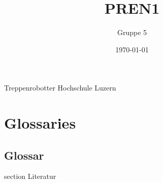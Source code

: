 \documentclass[oneside]{modern}
\title{PREN1}
\author{Gruppe 5}
\date{\today}
\begin{document}
  \nocite{*}

  \firstpage
    {Treppenrobotter}
    {Hochschule Luzern}
    {\theauthor}

  \addtableofcontents

  \newpage
  
  


  
  
  

  
  \chapter{Glossaries}
  \section{Glossar}

  \addglossary

  \newpage
    {section}
    {Literatur}

  \printbibliography[
    heading=subbibliography
  ]

  \newpage
  \listoffigures
\end{document}
